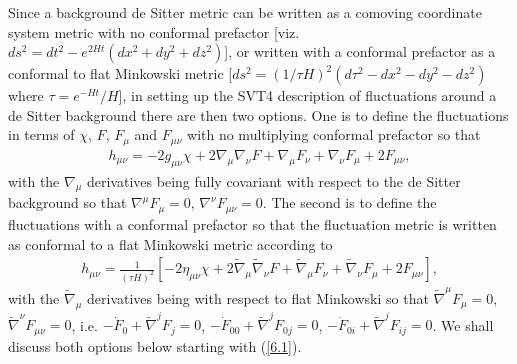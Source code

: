 Since a background de Sitter metric can be written as a comoving coordinate system metric with no conformal prefactor [viz. $ds^2=dt^2-e^{2Ht}(dx^2+dy^2+dz^2)$],  or written with a conformal prefactor as  a conformal to flat Minkowski metric [$ds^2=(1/\tau H)^2(d\tau^2-dx^2-dy^2-dz^2)$ where $\tau=e^{-Ht}/H$],  in setting up the SVT4 description of fluctuations around a de Sitter background there are then two options. One is to define the fluctuations in terms of $\chi$, $F$, $F_{\mu}$ and $F_{\mu\nu}$ with no multiplying conformal prefactor so that
%
\begin{eqnarray}
h_{\mu\nu}=-2g_{\mu\nu}\chi+2\nabla_{\mu}\nabla_{\nu}F
+ \nabla_{\mu}F_{\nu}+\nabla_{\nu}F_{\mu}+2F_{\mu\nu},
\label{6.1}
\end{eqnarray}
%
with the $\nabla_{\mu}$ derivatives being fully covariant with respect to the de Sitter background so that $\nabla^{\mu}F_{\mu}=0$, $\nabla^{\nu}F_{\mu\nu}=0$. The second is to define the fluctuations with a conformal prefactor so that the fluctuation metric is written as conformal to a flat Minkowski metric according to
%
\begin{eqnarray}
h_{\mu\nu}=\frac{1}{(\tau H)^2}[-2\eta_{\mu\nu}\chi+2\tilde{\nabla}_{\mu}\tilde{\nabla}_{\nu}F
+ \tilde{\nabla}_{\mu}F_{\nu}+\tilde{\nabla}_{\nu}F_{\mu}+2F_{\mu\nu}],
\label{6.2}
\end{eqnarray}
%
with the $\tilde{\nabla}_{\mu}$ derivatives being with respect to flat Minkowski so that $\tilde{\nabla}^{\mu}F_{\mu}=0$, $\tilde{\nabla}^{\nu}F_{\mu\nu}=0$, i.e. $-\dot{F}_0+\tilde{\nabla}^jF_j=0$, $-\dot{F}_{00}+\tilde{\nabla}^jF_{0j}=0$, $-\dot{F}_{0i}+\tilde{\nabla}^jF_{ij}=0$. We shall discuss both options below starting with (\ref{6.1}). 

